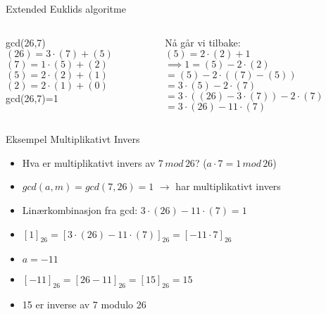 \begin{frame}{Extended Euklids algoritme}
    \begin{columns}
        \begin{column}{0.45\textwidth}
             gcd(26,7)\\
             
             $(26)=3\cdot (7)+(5)$\\
             $(7)=1\cdot (5)+(2)$\\
             $(5)=2\cdot(2)+(1)$\\
             $(2)=2\cdot(1)+(0)$\\
             
             gcd(26,7)=1
        \end{column}
        \pause
        \begin{column}{0.45\textwidth}
            Nå går vi tilbake:\\
            $(5)=2\cdot(2)+1$\\
            
            $\implies 1=(5)-2\cdot (2)$\\
            $=(5)-2\cdot ((7)-(5))$\\
            $=3\cdot (5)-2\cdot(7)$\\
            $=3\cdot ((26)-3\cdot (7))-2\cdot (7)$\\
            $=3\cdot (26)-11\cdot (7)$
        \end{column}
    \end{columns}
\end{frame}


\begin{frame}{Eksempel Multiplikativt Invers}
\begin{itemize}[<+->]
\item Hva er multiplikativt invers av $7\, mod\, 26$? ($a\cdot 7=1\, mod\, 26$)
\item $gcd(a,m) = gcd(7,26)=1$ $\rightarrow$ har multiplikativt invers
\item Linærkombinasjon fra gcd: $3\cdot (26)-11\cdot (7)=1$
\item $[1]_{26}=[3\cdot (26)-11\cdot (7)]_{26}=[-11\cdot 7]_{26}$
\item $a=-11$
\item $[-11]_{26}=[26-11]_{26}=[15]_{26}=15$
\item 15 er inverse av 7 modulo 26

\end{itemize}
\end{frame}
